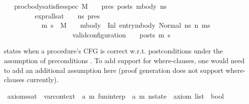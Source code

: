 \begin{isabellebody}
\ \ \ {\isachardoublequoteopen}proc{\isacharunderscore}{\kern0pt}body{\isacharunderscore}{\kern0pt}satisfies{\isacharunderscore}{\kern0pt}spec\ M\ {\isasymLambda}\ {\isasymGamma}\ {\isasymOmega}\ pres\ posts\ mbody\ ns\ {\isasymequiv}\isanewline
\ \ \ \ \ \ \ \ \ expr{\isacharunderscore}{\kern0pt}all{\isacharunderscore}{\kern0pt}sat\ {\isasymLambda}\ {\isasymGamma}\ {\isasymOmega}\ ns\ pres\ {\isasymlongrightarrow}\ \isanewline
\ \ \ \ \ \ \ \ \ \ {\isacharparenleft}{\kern0pt}{\isasymforall}\ m{\isacharprime}{\kern0pt}\ s{\isacharprime}{\kern0pt}{\isachardot}{\kern0pt}\ {\isacharparenleft}{\kern0pt}\ M{\isacharcomma}{\kern0pt}\ {\isasymLambda}{\isacharcomma}{\kern0pt}\ {\isasymGamma}{\isacharcomma}{\kern0pt}\ {\isasymOmega}{\isacharcomma}{\kern0pt}\ mbody\ {\isasymturnstile}\ {\isacharparenleft}{\kern0pt}Inl\ {\isacharparenleft}{\kern0pt}entry{\isacharparenleft}{\kern0pt}mbody{\isacharparenright}{\kern0pt}{\isacharparenright}{\kern0pt}{\isacharcomma}{\kern0pt}\ Normal\ ns{\isacharparenright}{\kern0pt}\ {\isacharminus}{\kern0pt}n{\isasymrightarrow}{\isacharasterisk}{\kern0pt}\ {\isacharparenleft}{\kern0pt}m{\isacharprime}{\kern0pt}{\isacharcomma}{\kern0pt}s{\isacharprime}{\kern0pt}{\isacharparenright}{\kern0pt}{\isacharparenright}{\kern0pt}\ {\isasymlongrightarrow}\ \isanewline
\ \ \ \ \ \ \ \ \ \ \ \ \ \ \ \ \ \ \ \ valid{\isacharunderscore}{\kern0pt}configuration\ {\isasymLambda}\ {\isasymGamma}\ {\isasymOmega}\ posts\ m{\isacharprime}{\kern0pt}\ s{\isacharprime}{\kern0pt}{\isacharparenright}{\kern0pt}\isanewline
\ \ \ \ \ \ {\isachardoublequoteclose}%
\begin{isamarkuptext}%
 states when a procedure's CFG is correct w.r.t. postconditions  
under the assumption of preconditions . To add support for where-clauses, one would need to 
add an additional assumption here (proof generation does not support where-clauses currently).%
\end{isamarkuptext}\isamarkuptrue%
\isamarkupfalse%
\ axioms{\isacharunderscore}{\kern0pt}sat\ {\isacharcolon}{\kern0pt}{\isacharcolon}{\kern0pt}\ {\isachardoublequoteopen}var{\isacharunderscore}{\kern0pt}context\ {\isasymRightarrow}\ {\isacharparenleft}{\kern0pt}{\isacharprime}{\kern0pt}a{\isacharcomma}{\kern0pt}\ {\isacharprime}{\kern0pt}m{\isacharparenright}{\kern0pt}\ fun{\isacharunderscore}{\kern0pt}interp\ {\isasymRightarrow}\ {\isacharparenleft}{\kern0pt}{\isacharprime}{\kern0pt}a{\isacharcomma}{\kern0pt}\ {\isacharprime}{\kern0pt}m{\isacharparenright}{\kern0pt}\ nstate\ {\isasymRightarrow}\ axiom\ list\ {\isasymRightarrow}\ bool{\isachardoublequoteclose}\isanewline

\end{isabellebody}
